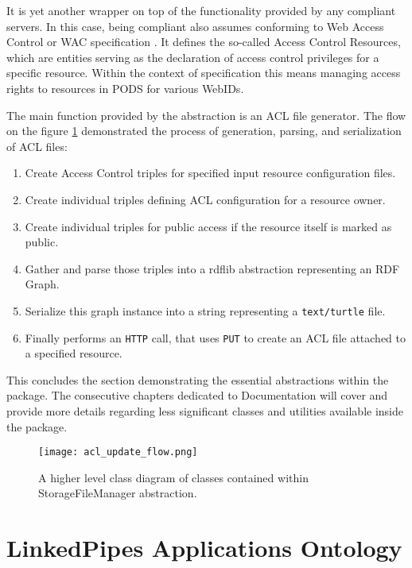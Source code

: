 It is yet another wrapper on top of the functionality provided by any \solid{} compliant servers. In this case, being \solid{} compliant also assumes conforming to Web Access Control or WAC specification \cite{Solid:WAC}. It defines the so-called Access Control Resources, which are entities serving as the declaration of access control privileges for a specific resource. Within the context of \solid{} specification this means managing access rights to resources in \solid{} PODS for various WebIDs.

The main function provided by the abstraction is an ACL file generator. The flow on the figure \ref{fig:lps_acl_update_flow} demonstrated the process of generation, parsing, and serialization of ACL files: 

\begin{enumerate}
    \item Create Access Control triples for specified input resource configuration files.
    \item Create individual triples defining ACL configuration for a resource owner.
    \item Create individual triples for public access if the resource itself is marked as public.
    \item Gather and parse those triples into a rdflib abstraction representing an RDF Graph.
    \item Serialize this graph instance into a string representing a \texttt{text/turtle} file.
    \item Finally performs an \texttt{HTTP} call, that uses \texttt{PUT} to create an ACL file attached to a specified resource.
\end{enumerate}

This concludes the section demonstrating the essential abstractions within the \lpas{} package. The consecutive chapters dedicated to Documentation will cover and provide more details regarding less significant classes and utilities available inside the package.

\begin{figure}[h]
\centering
\texttt{[image: acl\_update\_flow.png]}
\caption{A higher level class diagram of classes contained within StorageFileManager abstraction.}
\label{fig:lps_acl_update_flow}
\end{figure}


\section{LinkedPipes Applications Ontology}

